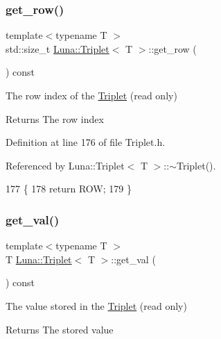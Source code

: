 \subsubsection{\texorpdfstring{get\+\_\+row()}{get\_row()}}
{\footnotesize\ttfamily template$<$typename T $>$ \\
std\+::size\+\_\+t \hyperlink{classLuna_1_1Triplet}{Luna\+::\+Triplet}$<$ T $>$\+::get\+\_\+row (\begin{DoxyParamCaption}{ }\end{DoxyParamCaption}) const\hspace{0.3cm}{\ttfamily [inline]}}



The row index of the \hyperlink{classLuna_1_1Triplet}{Triplet} (read only) 

\begin{DoxyReturn}{Returns}
The row index 
\end{DoxyReturn}


Definition at line 176 of file Triplet.\+h.



Referenced by Luna\+::\+Triplet$<$ T $>$\+::$\sim$\+Triplet().


\begin{DoxyCode}
177     \{
178         \textcolor{keywordflow}{return} ROW;
179     \}
\end{DoxyCode}
\mbox{\label{classLuna_1_1Triplet_ab0b45980f9930e0cade9c2ad5f254c87}} 
\subsubsection{\texorpdfstring{get\+\_\+val()}{get\_val()}}
{\footnotesize\ttfamily template$<$typename T $>$ \\
T \hyperlink{classLuna_1_1Triplet}{Luna\+::\+Triplet}$<$ T $>$\+::get\+\_\+val (\begin{DoxyParamCaption}{ }\end{DoxyParamCaption}) const\hspace{0.3cm}{\ttfamily [inline]}}



The value stored in the \hyperlink{classLuna_1_1Triplet}{Triplet} (read only) 

\begin{DoxyReturn}{Returns}
The stored value 
\end{DoxyReturn}


